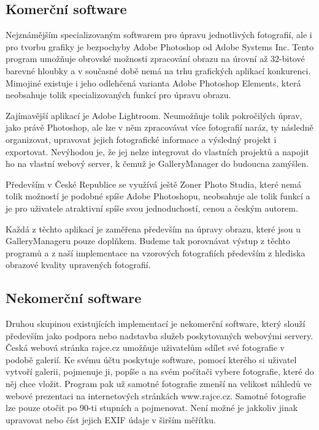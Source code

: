 \documentclass[11pt,twoside,a4paper]{book}
\begin{document}
\subsection{Komerční software}
\noindent
Nejznámějším specializovaným softwarem pro úpravu jednotlivých fotografií, ale i pro tvorbu grafiky je bezpochyby Adobe Photoshop od Adobe Systems Inc. Tento program umožňuje obrovské možnosti zpracování obrazu na úrovní až 32-bitové barevné hloubky a v současné době nemá na trhu grafických aplikací konkurenci. Mimojiné existuje i jeho odlehčená varianta Adobe Photoshop Elements, která neobsahuje tolik specializovaných funkcí pro úpravu obrazu. 

\indent
Zajímavější aplikací je Adobe Lightroom. Neumožňuje tolik pokročilých úprav, jako právě Photoshop, ale lze v něm zpracovávat více fotografií naráz, ty následně organizovat, upravovat jejich fotografické informace a výsledný projekt i exportovat. Nevýhodou je, že jej nelze integrovat do vlastních projektů a napojit ho na vlastní webový server, k čemuž je GalleryManager do budoucna zamýšlen.

\indent
Především v České Republice se využívá ještě Zoner Photo Studia, které nemá tolik možností je podobné spíše Adobe Photoshopu, neobsahuje ale tolik funkcí a je pro uživatele atraktivní spíše svou jednoduchostí, cenou a českým autorem.

\indent
Každá z těchto aplikací je zaměřena především na úpravy obrazu, které jsou u GalleryManageru pouze doplňkem. Budeme tak porovnávat výstup z těchto programů a z naší implementace na vzorových fotografiích především z hlediska obrazové kvality upravených fotografií.

\subsection{Nekomerční software}
\noindent
Druhou skupinou existujících implementací je nekomerční software, který slouží především jako podpora nebo nadstavba služeb poskytovaných webovými servery. Česká webová stránka rajce.cz umožňuje uživatelům sdílet své fotografie v podobě galerií. Ke svému účtu poskytuje software, pomocí kterého si uživatel vytvoří galerii, pojmenuje ji, popíše a na svém počítači vybere fotografie, které do něj chce vložit. Program pak už samotné fotografie zmenší na velikost náhledů ve webové prezentaci na internetových stránkách www.rajce.cz. Samotné fotografie lze pouze otočit po 90-ti stupních a pojmenovat. Není možné je jakkoliv jinak upravovat nebo číst jejich EXIF údaje v širším měřítku.
\end{document}

